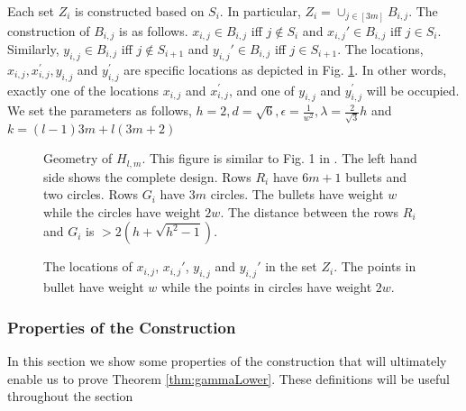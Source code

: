 \documentclass{article}
\begin{document}
Each set $Z_i$ is constructed based on $S_i$. In particular, $Z_i = \cup_{j\in [3m]} B_{i,j}$. The construction of $B_{i,j}$ is as follows. $x_{i,j} \in B_{i,j}$ iff $j \not\in S_i$ and $x_{i,j}' \in B_{i,j}$ iff $j \in S_i$. Similarly,  $y_{i,j} \in B_{i,j}$ iff $j \not\in S_{i+1}$ and $y_{i,j}' \in B_{i,j}$ iff $j \in S_{i+1}$. The locations, $x_{i, j}, x_{i,j}^\prime, y_{i,j}$ and $y_{i, j}^\prime$ are specific locations as depicted in Fig. \ref{fig:ZFig}. In other words, exactly one of the locations $x_{i,j}$ and $x_{i,j}^\prime$, and one of $y_{i,j}$ and $y_{i,j}^\prime$ will be occupied. We set the parameters as follows, $h = 2, d = \sqrt{6}, \epsilon = \frac{1}{w^2}, \lambda = \frac{2}{\sqrt{3}}h$ and $k = (l-1)3m + l(3m+2)$



  \begin{figure}[!tbp]
  \centering
  \begin{minipage}[b]{0.49\textwidth}
    \resizebox{\linewidth}{!}{}
    \caption{Geometry of $H_{l,m}$. This figure is similar to Fig. 1 in \cite{vattani2009hardness}. The left hand side shows the complete design. Rows $R_i$ have $6m+1$ bullets and two circles. Rows $G_i$ have $3m$ circles. The bullets have weight $w$ while the circles have weight $2w$. The distance between the rows $R_i$ and $G_i$ is $> 2(h+\sqrt{h^2-1})$.}
    \label{fig:lowerBoundComponent}
  \end{minipage}
  \hfill
  \begin{minipage}[b]{0.49\textwidth}
    
    \caption{The locations of $x_{i,j}$, $x_{i,j}'$, $y_{i,j}$ and $y_{i,j}'$ in the set $Z_i$. The points in bullet have weight $w$ while the points in circles have weight $2w$.}
    \label{fig:ZFig}
  \end{minipage}
\end{figure}

\subsubsection{Properties of the Construction}

In this section we show some properties of the construction that will ultimately enable us to prove Theorem \ref{thm:gammaLower}. These definitions will be useful throughout the section
\end{document}
